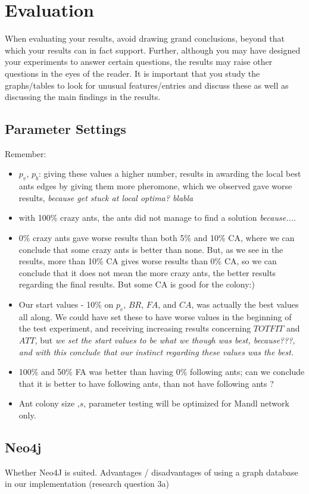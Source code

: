\section{Evaluation}

When evaluating your results, avoid drawing grand conclusions, beyond that which your results can in fact support. Further, although you may have designed your experiments to answer certain questions, the results may raise other questions in the eyes of the reader. It is important that you study the graphs/tables to look for unusual features/entries and discuss these as well as discussing the main findings in the results. 

\subsection{Parameter Settings}
Remember:
\begin{itemize}
\item $p_v$, $p_b$: giving these values a higher number, results in awarding the local best ants edges by giving them more pheromone, which we observed gave worse results, \emph{\color{red}because get stuck at local optima? blabla}
\item with 100\% crazy ants, the ants did not manage to find a solution \emph{\color{red}because...}. 
\item 0\% crazy ants gave worse results than both 5\% and 10\% CA, where we can conclude that some crazy ants is better than none. But, as we see in the results, more than 10\% CA gives worse results than 0\% CA, so we can conclude that it does not mean the more crazy ants, the better results regarding the final results. But some CA is good for the colony:)
\item Our start values - 10\% on $p_e$, $BR$, $FA$, and $CA$, was actually the best values all along. We could have set these to have worse values in the beginning of the test experiment, and receiving increasing results concerning $TOTFIT$ and $ATT$, but \emph{\color{red} we set the start values to be what we though was best, because???, and with this conclude that our instinct regarding these values was the best.}
\item 100\% and 50\% FA was better than having 0\% following ants; can we conclude that it is better to have following ants, than not have following ants ?
\item Ant colony size ,$s$, parameter testing will be optimized for Mandl network only.
\end{itemize}

\subsection{Neo4j}

Whether Neo4J is suited. Advantages / disadvantages of using a graph database in our implementation (research question 3a)